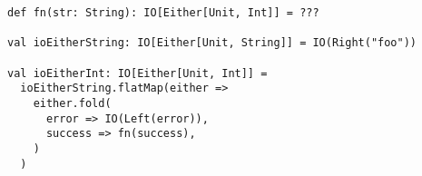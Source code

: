 \begin{algorithm}

\begin{verbatim}
def fn(str: String): IO[Either[Unit, Int]] = ???

val ioEitherString: IO[Either[Unit, String]] = IO(Right("foo"))

val ioEitherInt: IO[Either[Unit, Int]] =
  ioEitherString.flatMap(either =>
    either.fold(
      error => IO(Left(error)),
      success => fn(success),
    )
  )
\end{verbatim}

\caption{Syntax overhead of nesting Either and IO monads. %
\label{monadtransformer:io-either}}
\end{algorithm}